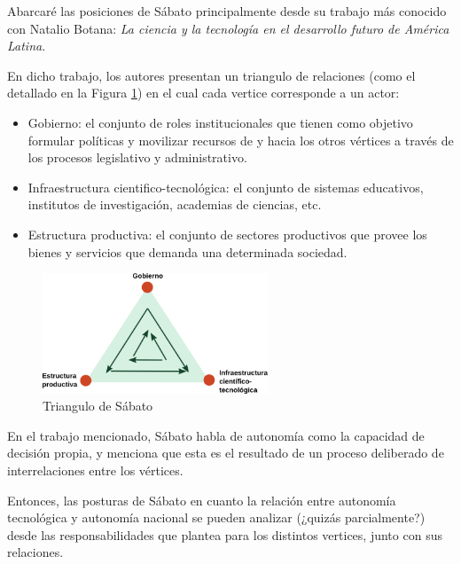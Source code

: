 Abarcaré las posiciones de Sábato principalmente desde su trabajo más conocido con Natalio Botana: \textit{La ciencia y
la tecnología en el desarrollo futuro de América Latina}.

En dicho trabajo, los autores presentan un triangulo de relaciones (como el detallado en la Figura \ref{triangulo}) en el cual cada vertice
corresponde a un actor:
\begin{itemize}
    \item Gobierno: el conjunto de roles institucionales que tienen como objetivo formular políticas y movilizar recursos de y hacia los otros vértices a través de los procesos legislativo y administrativo.
    \item Infraestructura cientifico-tecnológica: el conjunto de sistemas educativos, institutos de investigación, academias de ciencias, etc.
    \item Estructura productiva: el conjunto de sectores productivos que provee los bienes y servicios que demanda una determinada sociedad.
\end{itemize}

\begin{figure}[H]
    \centering
    \includegraphics[width=0.6\textwidth]{imagenes/sabato.png}
    \caption{Triangulo de Sábato}\label{triangulo}
\end{figure}


En el trabajo mencionado, Sábato habla de autonomía como la capacidad de decisión propia, y menciona que esta es el resultado de un proceso deliberado de interrelaciones entre los vértices.

Entonces, las posturas de Sábato en cuanto la relación entre autonomía tecnológica y
autonomía nacional se pueden analizar (¿quizás parcialmente?) desde las responsabilidades que plantea
para los distintos vertices, junto con sus relaciones.


